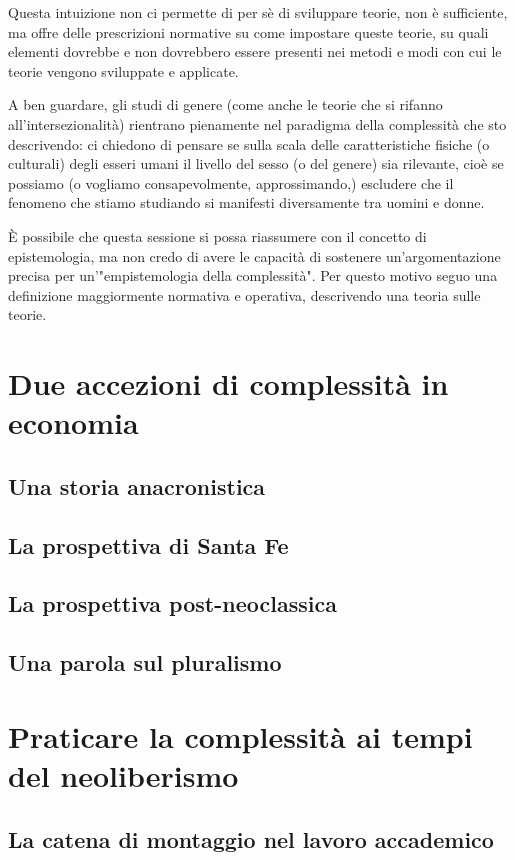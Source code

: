 \documentclass[a4paper, headings=standardclasses]{scrartcl}
\begin{document}
Questa intuizione non ci permette di per sè di sviluppare teorie, non è sufficiente, ma offre delle prescrizioni normative su come impostare queste teorie, su quali elementi dovrebbe e non dovrebbero essere presenti nei metodi e modi con cui le teorie vengono sviluppate e applicate.

A ben guardare, gli studi di genere (come anche le teorie che si rifanno all'intersezionalità) rientrano pienamente nel paradigma della complessità che sto descrivendo: ci chiedono di pensare se sulla scala delle caratteristiche fisiche (o culturali) degli esseri umani il livello del sesso (o del genere) sia rilevante, cioè se possiamo (o vogliamo consapevolmente, approssimando,) escludere che il fenomeno che stiamo studiando si manifesti diversamente tra uomini e donne.

È possibile che questa sessione si possa riassumere con il concetto di epistemologia, ma non credo di avere le capacità di sostenere un'argomentazione precisa per un'"empistemologia della complessità". Per questo motivo seguo una definizione maggiormente normativa e operativa, descrivendo una teoria sulle teorie.

\section{Due accezioni di complessità in economia}
\subsection{Una storia anacronistica}

\subsection{La prospettiva di Santa Fe}

\subsection{La prospettiva post-neoclassica}

\subsection{Una parola sul pluralismo}

\section{Praticare la complessità ai tempi del neoliberismo}
\subsection{La catena di montaggio nel lavoro accademico}
\end{document}
